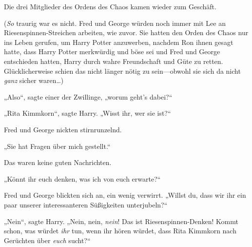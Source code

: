 Die drei Mitglieder des Ordens des Chaos kamen wieder zum Geschäft.

(\emph{So} traurig war es nicht. Fred und George würden noch immer mit Lee an Riesenspinnen-Streichen arbeiten, wie zuvor. Sie hatten den Orden des Chaos nur ins Leben gerufen, um Harry Potter anzuwerben, nachdem Ron ihnen gesagt hatte, dass Harry Potter merkwürdig und böse sei und Fred und George entschieden hatten, Harry durch wahre Freundschaft und Güte zu retten. Glücklicherweise schien das nicht länger nötig zu sein—obwohl sie sich da nicht \emph{ganz} sicher waren…)

„Also“, sagte einer der Zwillinge, „worum geht’s dabei?“

„Rita Kimmkorn“, sagte Harry. „Wisst ihr, wer sie ist?“

Fred und George nickten stirnrunzelnd.

„Sie hat Fragen über mich gestellt.“

Das waren keine guten Nachrichten.

„Könnt ihr euch denken, was ich von euch erwarte?“

Fred und George blickten sich an, ein wenig verwirrt. „Willst du, dass wir ihr ein paar unserer interessanteren Süßigkeiten unterjubeln?“

„Nein“, sagte Harry. „Nein, nein, \emph{nein}! Das ist Riesenspinnen-Denken! Kommt schon, was würdet \emph{ihr} tun, wenn ihr hören würdet, dass Rita Kimmkorn nach Gerüchten über \emph{euch} sucht?“

